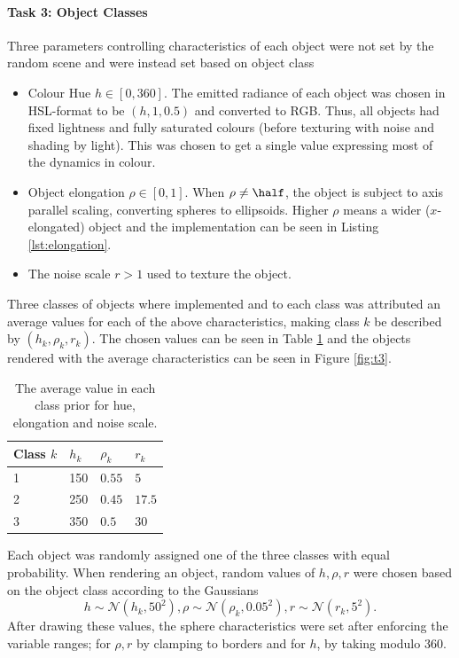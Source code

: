 \documentclass[12pt,fleqn]{article}
\begin{document}
\paragraph{Task 3: Object Classes}
Three parameters controlling characteristics of each object were not set by the random scene and were instead set based on object class
\begin{itemize}
    \item Colour Hue $h \in [0, 360]$. The emitted radiance of each object was chosen in HSL-format to be $(h, 1, 0.5)$ and converted to RGB. Thus, all objects had fixed lightness and fully saturated colours (before texturing with noise and shading by light). This was chosen to get a single value expressing most of the dynamics in colour.
    \item Object elongation $\rho \in [0, 1]$. When $\rho\ne \half$, the object is subject to axis parallel scaling, converting spheres to ellipsoids. 
        Higher $\rho$ means a wider ($x$-elongated) object and the implementation can be seen in Listing \ref{lst:elongation}.
    \item The noise scale $r > 1$ used to texture the object.
\end{itemize}
Three classes of objects where implemented and to each class was attributed an average values for each of the above characteristics, making class $k$ be described by $(h_k, \rho_k, r_k)$.
The chosen values can be seen in Table \ref{tab:class-avg} and the objects rendered with the average characteristics can be seen in Figure \ref{fig:t3}.
\begin{table}[H]
    \centering
        \begin{tabular}{l|lll}
            Class $k$ & $h_k$ & $\rho_k$ & $r_k$ \\
            \hline
            1 & 150 & $0.55$ & $5$ \\
            2 & 250 & $0.45$ & $17.5$ \\
            3 & 350 & $0.5$ & $30$
        \end{tabular}
    \caption{
        The average value in each class prior for hue, elongation and noise scale.
    }
    \label{tab:class-avg}
\end{table}\noindent
Each object was randomly assigned one of the three classes with equal probability.
When rendering an object, random values of $h, \rho, r$ were chosen based on the object class according to the Gaussians
\begin{equation}
    h \sim \mathcal N\left( h_k, 50^2 \right),
    \rho \sim \mathcal N\left( \rho_k, 0.05^2 \right),
    r \sim \mathcal N\left( r_k, 5^2 \right).
\end{equation}
After drawing these values, the sphere characteristics were set after enforcing the variable ranges; for $\rho, r$ by clamping to borders and for $h$, by taking modulo 360.
\end{document}
